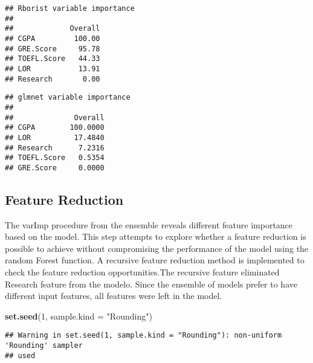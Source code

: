 \documentclass[11pt,]{article}
\newenvironment{Shaded}{\begin{snugshade}}{\end{snugshade}}
\newcommand{\DataTypeTok}[1]{\textcolor[rgb]{0.13,0.29,0.53}{#1}}
\newcommand{\DecValTok}[1]{\textcolor[rgb]{0.00,0.00,0.81}{#1}}
\newcommand{\KeywordTok}[1]{\textcolor[rgb]{0.13,0.29,0.53}{\textbf{#1}}}
\newcommand{\NormalTok}[1]{#1}
\newcommand{\OperatorTok}[1]{\textcolor[rgb]{0.81,0.36,0.00}{\textbf{#1}}}
\newcommand{\StringTok}[1]{\textcolor[rgb]{0.31,0.60,0.02}{#1}}
\begin{document}
\begin{verbatim}
## Rborist variable importance
## 
##             Overall
## CGPA         100.00
## GRE.Score     95.78
## TOEFL.Score   44.33
## LOR           13.91
## Research       0.00
\end{verbatim}

\begin{Shaded}
\end{Shaded}

\begin{verbatim}
## glmnet variable importance
## 
##              Overall
## CGPA        100.0000
## LOR          17.4840
## Research      7.2316
## TOEFL.Score   0.5354
## GRE.Score     0.0000
\end{verbatim}

\hypertarget{feature-reduction}{%
\subsection{Feature Reduction}\label{feature-reduction}}

The varImp procedure from the ensemble reveals different feature
importance based on the model. This step attempts to explore whether a
feature reduction is possible to achieve without compromising the
performance of the model using the random Forest function. A recursive
feature reduction method is implemented to check the feature reduction
opportunities.The recursive feature eliminated Research feature from the
modelo. Since the ensemble of models prefer to have different input
features, all features were left in the model.

\begin{Shaded}
\begin{Highlighting}[]
\KeywordTok{set.seed}\NormalTok{(}\DecValTok{1}\NormalTok{, }\DataTypeTok{sample.kind =} \StringTok{"Rounding"}\NormalTok{)}
\end{Highlighting}
\end{Shaded}

\begin{verbatim}
## Warning in set.seed(1, sample.kind = "Rounding"): non-uniform 'Rounding' sampler
## used
\end{verbatim}
\end{document}
